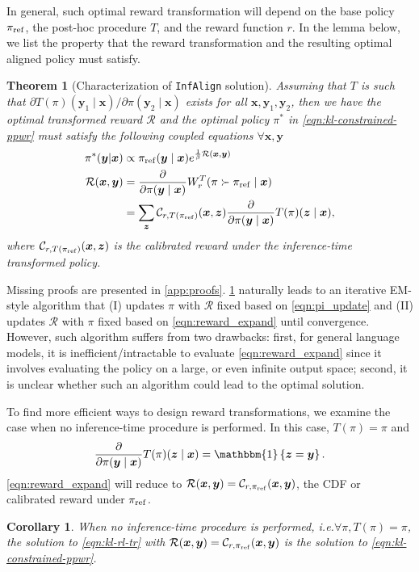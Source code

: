 \documentclass{article}
\makeatletter
\newcommand{\mc}{\mathcal}
\newcommand{\by}{{\bm{y}}}
\newcommand{\bx}{{\bm{x}}}
\newcommand{\bz}{{\bm{z}}}
\newcommand{\cR}{\mathcal{R}}
\newcommand{\tr}{\cR}
\newcommand{\pp}{T}
\newcommand{\bp}{{\pi_{\rm ref}}} %
\newcommand{\qt}{\mathcal{C}}
\newcommand{\iapo}{\texttt{InfAlign}\xspace}
\newtheorem{theorem}{Theorem}
\newtheorem{corollary}{Corollary}
\newcommand{\ie}{i.e.\@\xspace}
\makeatother
\begin{document}
In general, such optimal reward transformation will depend on the base policy $\bp$, the post-hoc procedure $T$, and the reward function $r$. In the lemma below, we list the property that the reward transformation and the resulting optimal aligned policy must satisfy.
\begin{theorem}[Characterization of \iapo solution] \label{lem:coupled}
Assuming that $T$ is such that $\partial T(\pi)(\by_1\mid\bx)/ \partial \pi (\by_2\mid\bx)$ exists for all $\bx, \by_1, \by_2$, then we have the optimal transformed reward $\tr$ and the optimal policy $\pi^*$ in \cref{eqn:kl-constrained-ppwr} must satisfy the following coupled equations $\forall \bx, \by$
\begin{align}
\pi^*(\by|\bx) & \propto \bp(\by \mid \bx) e^{\frac{1}{\beta} \tr(\bx,\by)} \label{eqn:pi_update}\\
    \tr(\bx,\by) &=  \frac{\partial  }{\partial \pi(\by \mid \bx)}W^\pp_r(\pi \succ \bp \mid \bx) \label{eqn:reward_update}
    \\ & 
    = \sum_{\bz} \qt_{r, T(\bp)}(\bx, \bz) \frac{\partial  }{\partial \pi(\by\mid \bx)}T(\pi)(\bz \mid\bx), \label{eqn:reward_expand}
\end{align}
where $\qt_{r, T(\bp)}(\bx , \bz) $ is the calibrated reward under the inference-time transformed policy.
\end{theorem}
%
%
%

Missing proofs are presented in \cref{app:proofs}. \cref{lem:coupled} naturally leads to an iterative EM-style algorithm that (I) updates $\pi$ with $\mc{R}$ fixed based on \cref{eqn:pi_update} and (II) updates $\mc{R}$ with $\pi$ fixed based on \cref{eqn:reward_expand} until convergence.  However, such algorithm suffers from two drawbacks: first, for general language models, it is inefficient/intractable to evaluate \cref{eqn:reward_expand} since it involves evaluating the policy on a large, or even infinite output space; second, it is unclear whether such an algorithm could lead to the optimal solution.

%

%
%


To find more efficient ways to design reward transformations, we examine the case when no inference-time procedure is performed. In this case, $T(\pi) = \pi$ and 
\[
    \frac{\partial  }{\partial \pi(\by\mid \bx)}T(\pi)(\bz \mid\bx) = \mathbbm{1}\left\{\bz = \by\right\}.
\]
\cref{eqn:reward_expand} will reduce to $ \tr(\bx,\by) =  \qt_{r, \bp}(\bx, \by)$, the CDF or calibrated reward under $\bp$. 
\begin{corollary} \label{cor:no_inference_procedure}
When no inference-time procedure is performed, \ie $\forall \pi, T(\pi) = \pi$, the solution to \cref{eqn:kl-rl-tr} with $\tr(\bx,\by) =  \qt_{r, \bp}(\bx, \by)$ is the solution to \cref{eqn:kl-constrained-ppwr}.
\end{corollary}
\end{document}
